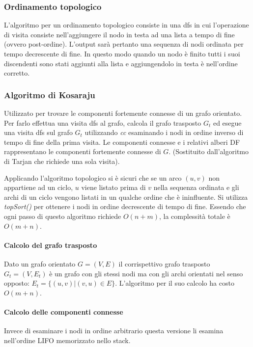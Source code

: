 \subsubsection{Ordinamento topologico}
L'algoritmo per un ordinamento topologico consiste in una dfs in cui l'operazione di visita consiste nell'aggiungere il nodo in testa ad una lista a tempo
di fine (ovvero post-ordine). L'output sar\`a pertanto una sequenza di nodi ordinata per tempo decrescente di fine. In questo modo quando un nodo \`e finito
tutti i suoi discendenti sono stati aggiunti alla lista e aggiungendolo in testa \`e nell'ordine corretto. 


\subsubsection{Algoritmo di Kosaraju}
Utilizzato per trovare le componenti fortemente connesse di un grafo orientato. Per farlo effettua una visita dfs al grafo, calcola il grafo trasposto $G_t$
ed esegue una visita dfs sul grafo $G_t$ utilizzando \emph{cc} esaminando i nodi in ordine inverso di tempo di fine della prima visita. Le componenti 
connesse e i relativi alberi DF rappresentano le componenti fortemente connesse di $G$. (Sostituito dall'algoritmo di Tarjan che richiede una sola visita).

Applicando l'algoritmo topologico si \`e sicuri che se un arco $(u, v)$ non appartiene ad un ciclo, $u$ viene listato prima di $v$ nella sequenza ordinata e
gli archi di un ciclo vengono listati in un qualche ordine che \`e ininfluente. Si utilizza \emph{topSort()} per ottenere i nodi in ordine decrescente di 
tempo di fine. Essendo che ogni passo di questo algoritmo richiede $O(n+m)$, la complessit\`a totale \`e $O(m+n)$.
\paragraph{Calcolo del grafo trasposto}
Dato un grafo orientato $G=(V, E)$ il corrispettivo grafo trasposto $G_t=(V, E_t)$ \`e un grafo con gli stessi nodi ma con gli archi orientati nel senso 
opposto: $E_t=\{(u, v)|(v, u)\in E\}$. L'algoritmo per il suo calcolo ha costo $O(m+n)$.

\newpage
\paragraph{Calcolo delle componenti connesse}
Invece di esaminare i nodi in ordine arbitrario questa versione li esamina nell'ordine LIFO memorizzato nello stack.
\begin{multicols}{2}

\columnbreak

\end{multicols}
